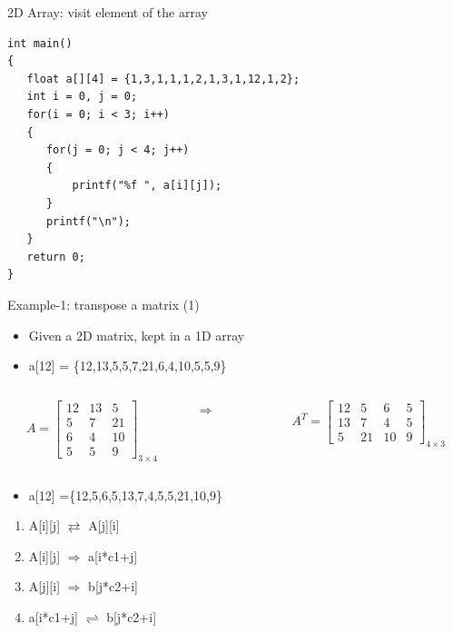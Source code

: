 \begin{frame}[fragile]{2D Array: visit element of the array}
\begin{lstlisting}[xleftmargin=0.08\linewidth, linewidth=0.85\linewidth]
int main()
{
   float a[][4] = {1,3,1,1,1,2,1,3,1,12,1,2};
   int i = 0, j = 0;
   for(i = 0; i < 3; i++)
   {
      for(j = 0; j < 4; j++)
      {
          printf("%f ", a[i][j]);
      }
      printf("\n");
   }
   return 0;
}
\end{lstlisting}
\end{frame}


\begin{frame}{Example-1: transpose a matrix (1)}
\begin{itemize}
	\item {Given a 2D matrix, kept in a 1D array}
	\item {a[12] = \{12,13,5,5,7,21,6,4,10,5,5,9\}}
\end{itemize}
\vspace{-0.1in}
\begin{columns}
\begin{column}{0.4\linewidth}
\begin{equation}
A=\left[
\begin{array}{ccc}
12 & 13 & 5 \\
5 & 7 & 21 \\
6 & 4 & 10 \\
5 & 5 & 9 
\end{array}
\right]_{3{\times}4} \nonumber
\end{equation}
\end{column}
\begin{column}{0.1\linewidth}
\begin{center}
$\Rightarrow$
\end{center}
\end{column}
\begin{column}{0.4\linewidth}
\begin{equation}
A^T=\left[ 
\begin{array}{cccc}
12 & 5 & 6 & 5 \\
13 & 7 & 4 & 5 \\
5 & 21 & 10 & 9
\end{array}
\right]_{4{\times}3} \nonumber
\end{equation}
\end{column}
\end{columns}
\begin{itemize}
	\item {a[12] =\{12,5,6,5,13,7,4,5,5,21,10,9\}}
\end{itemize}
\begin{enumerate}
	\item {A[i][j] $\rightleftarrows$ A[j][i]}
	\item {A[i][j] $\Rightarrow$ a[i*c1+j]}
	\item {A[j][i] $\Rightarrow$ b[j*c2+i]}
	\item {a[i*c1+j] $\rightleftharpoons$ b[j*c2+i]}
\end{enumerate}
\end{frame}

